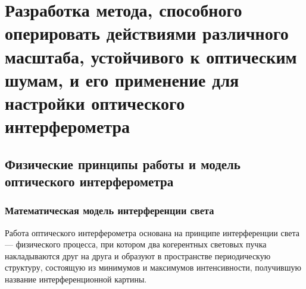 \chapter{Разработка метода, способного оперировать действиями различного масштаба, устойчивого к оптическим шумам, и его применение для настройки оптического интерферометра}\label{ch:ch2}

\section{Физические принципы работы и модель оптического интерферометра}\label{sec:ch2/sec1}

\subsection{Математическая модель интерференции света}\label{sec:ch2/sec1/subsec1}

Работа оптического интерферометра основана на принципе интерференции света --- физического процесса, при котором два когерентных световых пучка накладываются друг на друга и образуют в пространстве периодическую структуру, состоящую из минимумов и максимумов интенсивности, получившую название интерференционной картины. 


